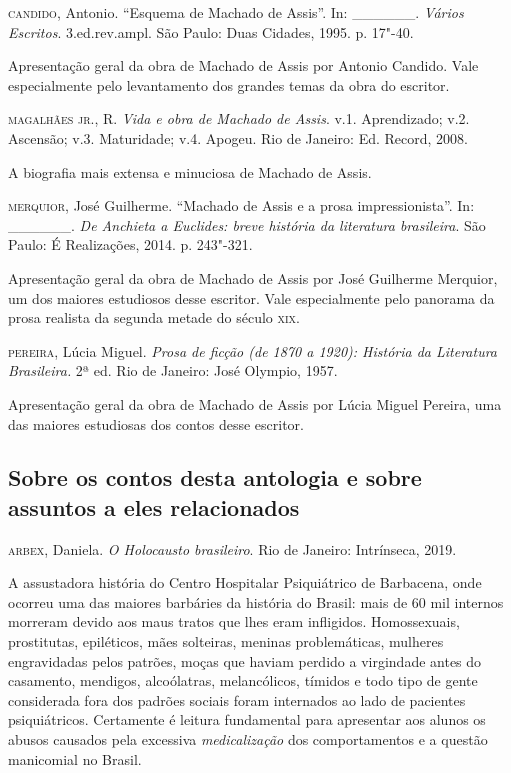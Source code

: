\documentclass{extarticle}
\begin{document}
\textsc{candido}, Antonio. ``Esquema de Machado de Assis''. In: \_\_\_\_\_\_.
\textit{Vários Escritos}. 3.ed.rev.ampl. São Paulo: Duas Cidades, 1995.
p. 17"-40.

Apresentação geral da obra de Machado de Assis por Antonio Candido. Vale
especialmente pelo levantamento dos grandes temas da obra do escritor.

\textsc{magalhães jr.}, R. \textit{Vida e obra de Machado de Assis}. v.1.
Aprendizado; v.2. Ascensão; v.3. Maturidade; v.4. Apogeu. Rio de
Janeiro: Ed. Record, 2008.

A biografia mais extensa e minuciosa de Machado de Assis.

\textsc{merquior}, José Guilherme. ``Machado de Assis e a prosa impressionista''.
In: \_\_\_\_\_\_. \textit{De Anchieta a Euclides: breve história da
literatura brasileira}. São Paulo: É Realizações, 2014. p. 243"-321.

Apresentação geral da obra de Machado de Assis por José Guilherme
Merquior, um dos maiores estudiosos desse escritor. Vale especialmente
pelo panorama da prosa realista da segunda metade do século \textsc{xix}.

\textsc{pereira}, Lúcia Miguel. \textit{Prosa de ficção (de 1870 a 1920):
História da Literatura Brasileira.} 2ª ed. Rio de Janeiro: José Olympio,
1957.

Apresentação geral da obra de Machado de Assis por Lúcia Miguel Pereira,
uma das maiores estudiosas dos contos desse escritor.

\subsection{Sobre os contos desta antologia e sobre assuntos a eles relacionados}

\textsc{arbex}, Daniela. \textit{O Holocausto brasileiro}. Rio de Janeiro:
Intrínseca, 2019.

A assustadora história do Centro Hospitalar Psiquiátrico de Barbacena,
onde ocorreu uma das maiores barbáries da história do Brasil: mais de 60
mil internos morreram devido aos maus tratos que lhes eram infligidos.
Homossexuais, prostitutas, epiléticos, mães solteiras, meninas
problemáticas, mulheres engravidadas pelos patrões, moças que haviam
perdido a virgindade antes do casamento, mendigos, alcoólatras,
melancólicos, tímidos e todo tipo de gente considerada fora dos padrões
sociais foram internados ao lado de pacientes psiquiátricos. Certamente
é leitura fundamental para apresentar aos alunos os abusos causados pela
excessiva \emph{medicalização} dos comportamentos e a questão manicomial
no Brasil.
\end{document}
